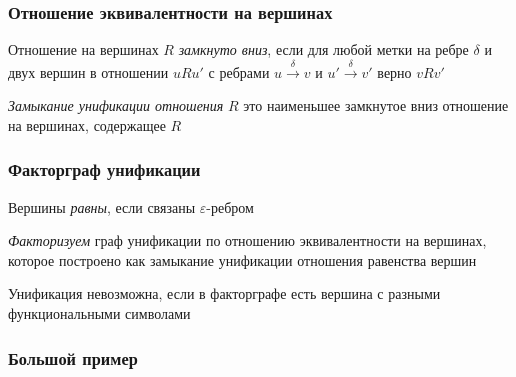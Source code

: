 \documentclass{beamer}
\begin{document}
\begin{frame}[fragile]
  \frametitle{Отношение эквивалентности на вершинах}
Отношение на вершинах $R$ \textit{замкнуто вниз}, если для любой метки на ребре $\delta$ и двух вершин в отношении $uRu'$ с ребрами $u \xrightarrow{\delta} v$ и $u' \xrightarrow{\delta} v'$ верно $vRv'$

\begin{center}
\end{center}

\bigskip

\textit{Замыкание унификации отношения} $R$ это наименьшее замкнутое вниз отношение на вершинах, содержащее $R$
\end{frame}

\begin{frame}[fragile]
  \frametitle{Факторграф унификации}
Вершины \textit{равны}, если связаны $\varepsilon$-ребром

\bigskip

\textit{Факторизуем} граф унификации по отношению эквивалентности на вершинах, которое построено как замыкание унификации отношения равенства вершин

\pause

\begin{center}
  
\end{center}

Унификация невозможна, если в факторграфе есть вершина с разными функциональными символами
\end{frame}


\begin{frame}[fragile]
  \frametitle{Большой пример}

  \begin{columns}
    \begin{column}{0.3\textwidth}
      
      \pause
    \end{column}
    \begin{column}{0.7\textwidth}
      \begin{center}
        
      \end{center}
    \end{column}
    \end{columns}

\end{frame}
\end{document}
